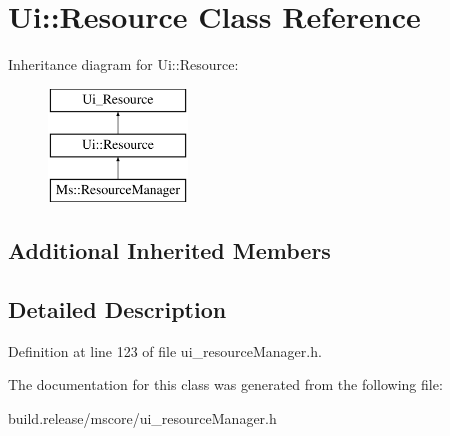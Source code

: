 \hypertarget{class_ui_1_1_resource}{}\section{Ui\+:\+:Resource Class Reference}
\label{class_ui_1_1_resource}
Inheritance diagram for Ui\+:\+:Resource\+:\begin{figure}[H]
\begin{center}
\leavevmode
\includegraphics[height=3.000000cm]{class_ui_1_1_resource}
\end{center}
\end{figure}
\subsection*{Additional Inherited Members}


\subsection{Detailed Description}


Definition at line 123 of file ui\+\_\+resource\+Manager.\+h.



The documentation for this class was generated from the following file\+:\begin{DoxyCompactItemize}
\item 
build.\+release/mscore/ui\+\_\+resource\+Manager.\+h\end{DoxyCompactItemize}
